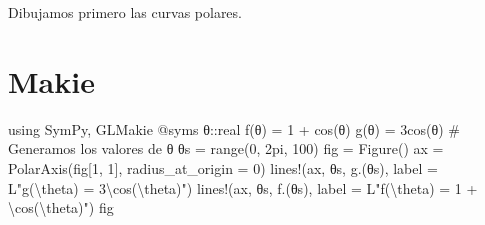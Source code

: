 \documentclass[
  a4paper,
]{scrreport}
\newenvironment{Shaded}{\begin{snugshade}}{\end{snugshade}}
\newcommand{\BuiltInTok}[1]{\textcolor[rgb]{0.00,0.23,0.31}{#1}}
\newcommand{\CommentTok}[1]{\textcolor[rgb]{0.37,0.37,0.37}{#1}}
\newcommand{\DataTypeTok}[1]{\textcolor[rgb]{0.68,0.00,0.00}{#1}}
\newcommand{\FloatTok}[1]{\textcolor[rgb]{0.68,0.00,0.00}{#1}}
\newcommand{\FunctionTok}[1]{\textcolor[rgb]{0.28,0.35,0.67}{#1}}
\newcommand{\ImportTok}[1]{\textcolor[rgb]{0.00,0.46,0.62}{#1}}
\newcommand{\NormalTok}[1]{\textcolor[rgb]{0.00,0.23,0.31}{#1}}
\newcommand{\OperatorTok}[1]{\textcolor[rgb]{0.37,0.37,0.37}{#1}}
\newcommand{\PreprocessorTok}[1]{\textcolor[rgb]{0.68,0.00,0.00}{#1}}
\newcommand{\SpecialCharTok}[1]{\textcolor[rgb]{0.37,0.37,0.37}{#1}}
\newcommand{\StringTok}[1]{\textcolor[rgb]{0.13,0.47,0.30}{#1}}
\theoremstyle{definition}
\theoremstyle{remark}
\begin{document}
\begin{tcolorbox}[enhanced jigsaw, bottomtitle=1mm, rightrule=.15mm, left=2mm, colback=white, title=\textcolor{quarto-callout-tip-color}{\faLightbulb}\hspace{0.5em}{Solución}, bottomrule=.15mm, colframe=quarto-callout-tip-color-frame, toprule=.15mm, leftrule=.75mm, opacityback=0, coltitle=black, breakable, colbacktitle=quarto-callout-tip-color!10!white, arc=.35mm, toptitle=1mm, titlerule=0mm, opacitybacktitle=0.6]

Dibujamos primero las curvas polares.

\section{Makie}

\begin{Shaded}
\begin{Highlighting}[]
\ImportTok{using} \BuiltInTok{SymPy}\NormalTok{, }\BuiltInTok{GLMakie}
\PreprocessorTok{@syms}\NormalTok{ θ}\OperatorTok{::}\DataTypeTok{real}
\FunctionTok{f}\NormalTok{(θ) }\OperatorTok{=} \FloatTok{1} \OperatorTok{+} \FunctionTok{cos}\NormalTok{(θ)}
\FunctionTok{g}\NormalTok{(θ) }\OperatorTok{=} \FloatTok{3}\FunctionTok{cos}\NormalTok{(θ)}
\CommentTok{\# Generamos los valores de θ}
\NormalTok{θs }\OperatorTok{=} \FunctionTok{range}\NormalTok{(}\FloatTok{0}\NormalTok{, }\FloatTok{2}\NormalTok{pi, }\FloatTok{100}\NormalTok{)}
\NormalTok{fig }\OperatorTok{=} \FunctionTok{Figure}\NormalTok{()}
\NormalTok{ax }\OperatorTok{=} \FunctionTok{PolarAxis}\NormalTok{(fig[}\FloatTok{1}\NormalTok{, }\FloatTok{1}\NormalTok{], radius\_at\_origin }\OperatorTok{=} \FloatTok{0}\NormalTok{)}
\FunctionTok{lines!}\NormalTok{(ax, θs, }\FunctionTok{g}\NormalTok{.(θs), label }\OperatorTok{=}\NormalTok{  L}\StringTok{"g(}\SpecialCharTok{\textbackslash{}t}\StringTok{heta) = 3\textbackslash{}cos(}\SpecialCharTok{\textbackslash{}t}\StringTok{heta)"}\NormalTok{)}
\FunctionTok{lines!}\NormalTok{(ax, θs, }\FunctionTok{f}\NormalTok{.(θs), label }\OperatorTok{=}\NormalTok{ L}\StringTok{"f(}\SpecialCharTok{\textbackslash{}t}\StringTok{heta) = 1 + \textbackslash{}cos(}\SpecialCharTok{\textbackslash{}t}\StringTok{heta)"}\NormalTok{)}
\NormalTok{fig}
\end{Highlighting}
\end{Shaded}


\end{tcolorbox}
\end{document}
